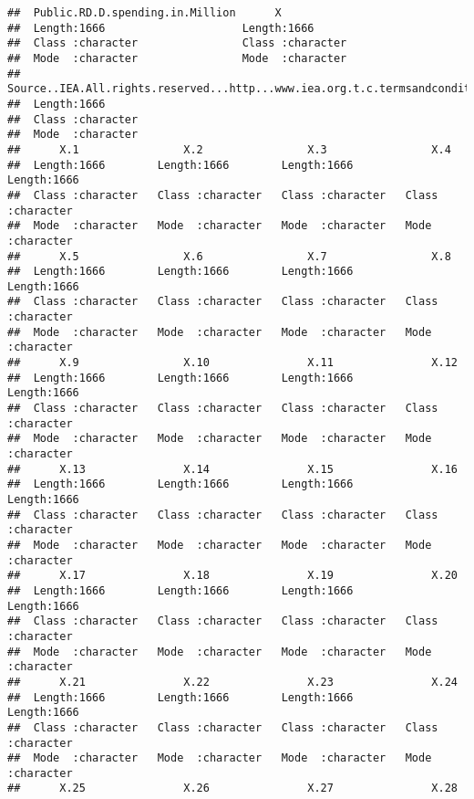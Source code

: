 \documentclass[
]{article}
\begin{document}
\begin{verbatim}
##  Public.RD.D.spending.in.Million      X            
##  Length:1666                     Length:1666       
##  Class :character                Class :character  
##  Mode  :character                Mode  :character  
##  Source..IEA.All.rights.reserved...http...www.iea.org.t.c.termsandconditions...
##  Length:1666                                                                   
##  Class :character                                                              
##  Mode  :character                                                              
##      X.1                X.2                X.3                X.4           
##  Length:1666        Length:1666        Length:1666        Length:1666       
##  Class :character   Class :character   Class :character   Class :character  
##  Mode  :character   Mode  :character   Mode  :character   Mode  :character  
##      X.5                X.6                X.7                X.8           
##  Length:1666        Length:1666        Length:1666        Length:1666       
##  Class :character   Class :character   Class :character   Class :character  
##  Mode  :character   Mode  :character   Mode  :character   Mode  :character  
##      X.9                X.10               X.11               X.12          
##  Length:1666        Length:1666        Length:1666        Length:1666       
##  Class :character   Class :character   Class :character   Class :character  
##  Mode  :character   Mode  :character   Mode  :character   Mode  :character  
##      X.13               X.14               X.15               X.16          
##  Length:1666        Length:1666        Length:1666        Length:1666       
##  Class :character   Class :character   Class :character   Class :character  
##  Mode  :character   Mode  :character   Mode  :character   Mode  :character  
##      X.17               X.18               X.19               X.20          
##  Length:1666        Length:1666        Length:1666        Length:1666       
##  Class :character   Class :character   Class :character   Class :character  
##  Mode  :character   Mode  :character   Mode  :character   Mode  :character  
##      X.21               X.22               X.23               X.24          
##  Length:1666        Length:1666        Length:1666        Length:1666       
##  Class :character   Class :character   Class :character   Class :character  
##  Mode  :character   Mode  :character   Mode  :character   Mode  :character  
##      X.25               X.26               X.27               X.28          

\end{verbatim}
\end{document}
